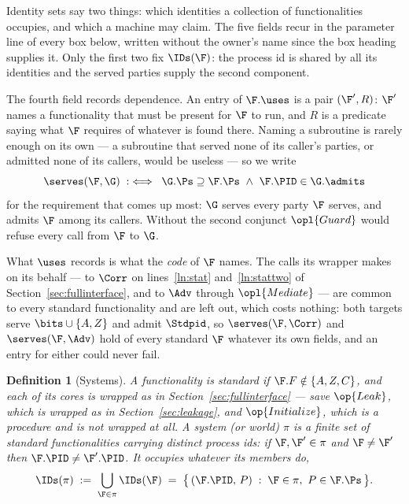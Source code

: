 \documentclass[10pt,oneside,openany]{book}
\theoremstyle{accentdef}
\newtheorem{definition}{Definition}[chapter]
\theoremstyle{accentplain}
\begin{document}
Identity sets say two things: which identities a collection of functionalities occupies, and
which a machine may claim. The five fields recur in the parameter line of every box below,
written without the owner's name since the box heading supplies it. Only
the first two fix $\IDs(\F)$: the process id is shared by all its identities and the served parties
supply the second component.

The fourth field records dependence. An entry of $\F.\uses$ is a pair $(\F',R)$: $\F'$ names a
functionality that must be present for $\F$ to run, and $R$ is a predicate saying what $\F$
requires of whatever is found there. Naming a subroutine is rarely enough on its own --- a
subroutine that served none of its caller's parties, or admitted none of its callers, would be
useless --- so we write
\[
  \serves(\F,\G) \;:\iff\; \G.\Ps \supseteq \F.\Ps \ \wedge\ \F.\PID \in \G.\admits
\]
for the requirement that comes up most: $\G$ serves every party $\F$ serves, and admits $\F$ among
its callers. Without the second conjunct $\opl{Guard}$ would refuse every call from $\F$ to $\G$.

What $\uses$ records is what the \emph{code} of $\F$ names. The calls its wrapper makes on its
behalf --- to $\Corr$ on lines~\ref{ln:stat} and~\ref{ln:stattwo} of
Section~\ref{sec:fullinterface}, and to $\Adv$ through $\opl{Mediate}$ --- are common to every
standard functionality and are left out, which costs nothing: both targets serve
$\bits \cup \{A,Z\}$ and admit $\Stdpid$, so $\serves(\F,\Corr)$ and $\serves(\F,\Adv)$ hold of every
standard $\F$ whatever its own fields, and an entry for either could never fail.

\begin{definition}[Systems]\label{def:sys}
A functionality is \emph{standard} if $\F.F \notin \{A,Z,C\}$, and each of
its cores is wrapped as in Section~\ref{sec:fullinterface} --- save $\op{Leak}$, which is wrapped
as in Section~\ref{sec:leakage}, and $\op{Initialize}$, which is a procedure and is not wrapped
at all. A \emph{system} (or
\emph{world}) $\pi$ is a finite set of standard functionalities carrying distinct process ids:
if $\F,\F' \in \pi$ and $\F \neq \F'$ then $\F.\PID \neq \F'.\PID$. It occupies whatever its
members do,
\[
  \IDs(\pi) \;:=\; \bigcup_{\F \in \pi} \IDs(\F) \;=\; \bigl\{\, (\F.\PID,\, P) \;:\; \F \in \pi,\ P \in \F.\Ps \,\bigr\} .
\]
\end{definition}
\end{document}
